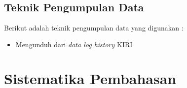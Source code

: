 \subsection{Teknik Pengumpulan Data}
Berikut adalah teknik pengumpulan data yang digunakan : 
\begin{itemize}
	\item Mengunduh dari \textsl{data log history} KIRI
\end{itemize}

\section{Sistematika Pembahasan}